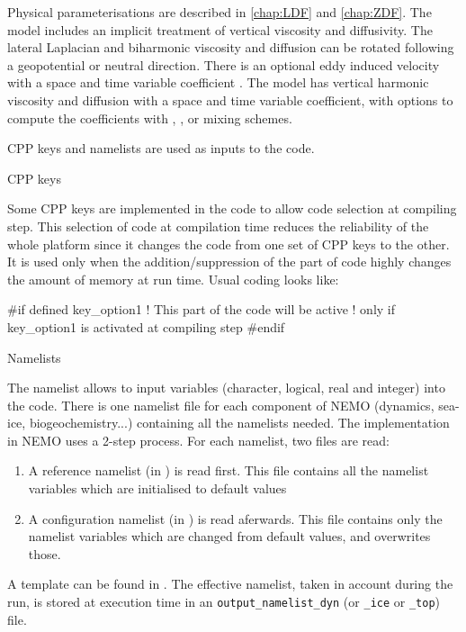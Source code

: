 \documentclass[../main/NEMO_manual]{subfiles}
\begin{document}
Physical parameterisations are described in \autoref{chap:LDF} and \autoref{chap:ZDF}.
The model includes an implicit treatment of vertical viscosity and diffusivity.
The lateral Laplacian and biharmonic viscosity and diffusion can be rotated following
a geopotential or neutral direction.
There is an optional eddy induced velocity \citep{gent.mcwilliams_JPO90} with a space and time variable coefficient
\citet{treguier.held.ea_JPO97}.
The model has vertical harmonic viscosity and diffusion with a space and time variable coefficient,
with options to compute the coefficients with \citet{blanke.delecluse_JPO93}, \citet{pacanowski.philander_JPO81}, or 
\citet{umlauf.burchard_JMR03} mixing schemes.
 
\noindent CPP keys and namelists are used as inputs to the code.

\noindent {} CPP keys

Some CPP keys are implemented in the \fortran code to allow code selection at compiling step.
This selection of code at compilation time reduces the reliability of the whole platform since
it changes the code from one set of CPP keys to the other.
It is used only when the addition/suppression of the part of code highly changes the amount of memory at run time.
Usual coding looks like: 

\begin{forlines}
#if defined key_option1
	! This part of the \fortran code will be active
	! only if key_option1 is activated at compiling step
#endif
\end{forlines}

\noindent {} Namelists

The namelist allows to input variables (character, logical, real and integer) into the code.
There is one namelist file for each component of NEMO (dynamics, sea-ice, biogeochemistry...)
containing all the \fortran namelists needed.
The implementation in NEMO uses a 2-step process. 
For each \fortran namelist, two files are read:

\begin{enumerate}
\item
  A reference namelist (in ) is read first.
  This file contains all the namelist variables which are initialised to default values
\item
  A configuration namelist (in ) is read aferwards.
  This file contains only the namelist variables which are changed from default values, and overwrites those.
\end{enumerate}
A template can be found in .
The effective namelist, taken in account during the run, is stored at execution time in
an \texttt{output\_namelist\_dyn} (or \texttt{\_ice} or \texttt{\_top}) file.
\end{document}
